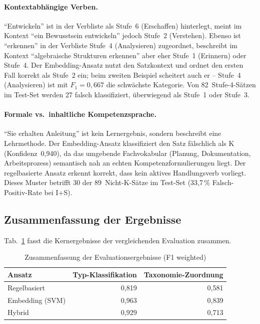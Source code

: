 \paragraph{Kontextabhängige Verben.}
\enquote{Entwickeln} ist in der Verbliste als Stufe~6 (Erschaffen) hinterlegt, meint im Kontext \enquote{ein Bewusstsein entwickeln} jedoch Stufe~2 (Verstehen).
Ebenso ist \enquote{erkennen} in der Verbliste Stufe~4 (Analysieren) zugeordnet, beschreibt im Kontext \enquote{algebraische Strukturen erkennen} aber eher Stufe~1 (Erinnern) oder Stufe~4.
Der Embedding-Ansatz nutzt den Satzkontext und ordnet den ersten Fall korrekt als Stufe~2 ein; beim zweiten Beispiel scheitert auch er -- Stufe~4 (Analysieren) ist mit $F_1 = 0{,}667$ die schwächste Kategorie.
Von 82~Stufe-4-Sätzen im Test-Set werden 27 falsch klassifiziert, überwiegend als Stufe~1 oder Stufe~3.

\paragraph{Formale vs.\ inhaltliche Kompetenzsprache.}
\enquote{Sie erhalten Anleitung} ist kein Lernergebnis, sondern beschreibt eine Lehrmethode.
Der Embedding-Ansatz klassifiziert den Satz fälschlich als K (Konfidenz~0{,}940), da das umgebende Fachvokabular (Planung, Dokumentation, Arbeitsprozess) semantisch nah an echten Kompetenzformulierungen liegt.
Der regelbasierte Ansatz erkennt korrekt, dass kein aktives Handlungsverb vorliegt.
Dieses Muster betrifft 30 der 89~Nicht-K-Sätze im Test-Set (33{,}7\,\% Falsch-Positiv-Rate bei I+S).

\subsection{Zusammenfassung der Ergebnisse}\label{sec:eval-zusammenfassung}

Tab.~\ref{tab:eval-zusammenfassung} fasst die Kernergebnisse der vergleichenden Evaluation zusammen.

\begin{table}[H]
\caption{Zusammenfassung der Evaluationsergebnisse (F1 weighted)\label{tab:eval-zusammenfassung}}
\centering
\begin{tabular}{lrr}
\hline
\textbf{Ansatz} & \textbf{Typ-Klassifikation} & \textbf{Taxonomie-Zuordnung} \\
\hline
Regelbasiert & 0{,}819 & 0{,}581 \\
Embedding (SVM) & 0{,}963 & 0{,}839 \\
Hybrid & 0{,}929 & 0{,}713 \\
\hline
\end{tabular}
\end{table}

